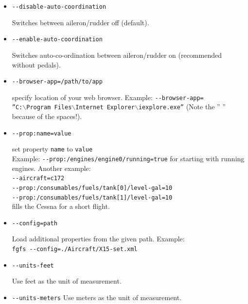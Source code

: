 \begin{itemize}
\item{\texttt{-$ $-disable-auto-coordination}}

  Switches  between aileron/rudder off (default).

\item{\texttt{-$ $-enable-auto-coordination}}

  Switches auto-co-ordination between aileron/rudder on (recommended
  without pedals).

\item{\texttt{-$ $-browser-app=/path/to/app}}

  specify location of your web browser. Example:
  \texttt{-$ $-browser-app=}\\
  \texttt{''C:$\backslash$Program~Files$\backslash$Internet~Explorer$\backslash$iexplore.exe''}
  (Note the '' '' because of the spaces!).

\item{\texttt{-$ $-prop:name=value}}

  set property \texttt{name} to \texttt{value}\\Example:
\texttt{-$ $-prop:/engines/engine0/running=true} for starting with running engines. Another example:\\
\texttt{-$ $-aircraft=c172}\\
\texttt{-$ $-prop:/consumables/fuels/tank[0]/level-gal=10}\\
\texttt{-$ $-prop:/consumables/fuels/tank[1]/level-gal=10}\\
fills the Cessna for a short flight.

\item{\texttt{-$ $-config=path}}

  Load additional properties from the given path. Example:\\
  \texttt{fgfs -$ $-config=./Aircraft/X15-set.xml}

\item{\texttt{-$ $-units-feet}}

  Use feet as the unit of measurement.

\item{\texttt{-$ $-units-meters}}
  Use meters as the unit of measurement.
\end{itemize}
